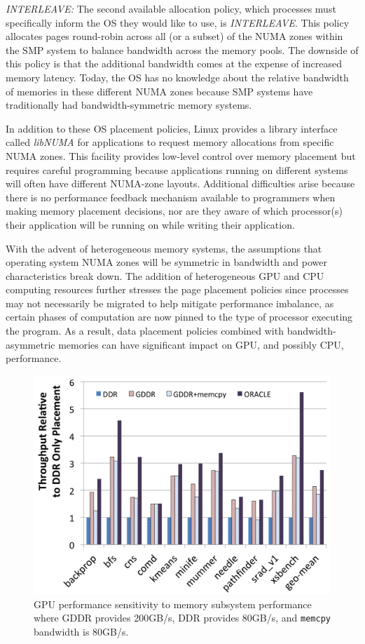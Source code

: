 \emph{INTERLEAVE:} The second available allocation policy, which processes must
specifically inform the OS they would like to use, is \emph{INTERLEAVE}\@. This
policy allocates pages round-robin across all (or a subset) of the NUMA zones
within the SMP system to balance bandwidth across the memory pools.  The
downside of this policy is that the additional bandwidth comes at the expense of
increased memory latency. Today, the OS has no knowledge about the relative
bandwidth of memories in these different NUMA zones because SMP systems have
traditionally had bandwidth-symmetric memory systems.

In addition to these OS placement policies, Linux provides a library interface
called \textit{libNUMA} for applications to request memory allocations from
specific NUMA zones.  This facility provides low-level control over memory
placement but requires careful programming because applications running on
different systems will often have different NUMA-zone layouts.  Additional
difficulties arise because there is no performance feedback mechanism available
to programmers when making memory placement decisions, nor are they aware of
which processor(s) their application will be running on while writing their
application.

With the advent of heterogeneous memory systems, the assumptions that operating
system NUMA zones will be symmetric in bandwidth and power
characteristics break down.  The addition of heterogeneous GPU and CPU computing
resources further stresses the page placement policies since processes may not
necessarily be migrated to help mitigate performance imbalance, as certain
phases of computation are now pinned to the type of processor executing the
program.  As a result, data placement policies combined with
bandwidth-asymmetric memories can have significant impact on GPU, and possibly
CPU, performance.

\begin{figure}[t]
    \centering
    \includegraphics[width=0.7\columnwidth]{hpca2015/figures/motivation.png}
    \caption{GPU performance sensitivity to memory subsystem performance where GDDR provides 
    200GB/s, DDR provides 80GB/s, and {\tt memcpy} bandwidth is 80GB/s.}
    \label{fig:motivation}
\end{figure}

